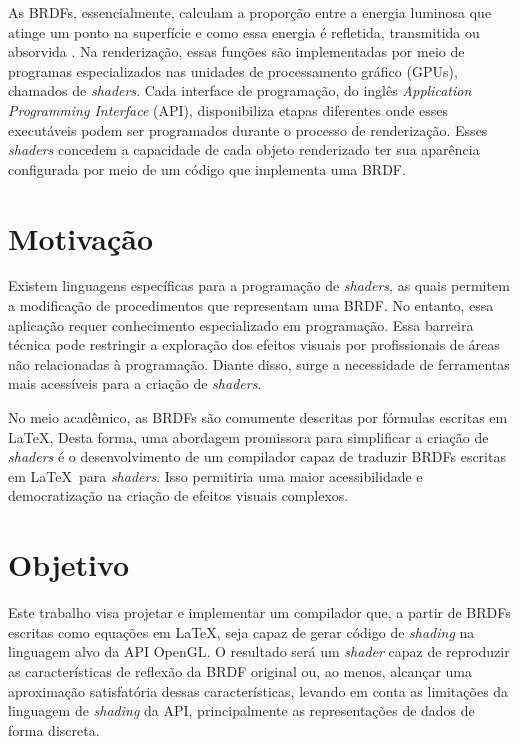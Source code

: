 \documentclass[english, 
               brazil, 
               bsc] %
               {dcomp-abntex2}
\begin{document}
As BRDFs, essencialmente, calculam a proporção entre a energia luminosa que atinge um ponto na superfície e como essa energia é refletida, transmitida ou absorvida \cite{pbr}. Na renderização, essas funções são implementadas por meio de programas especializados nas unidades de processamento gráfico (GPUs), chamados de \textit{shaders}. Cada interface de programação, do inglês \textit{ Application Programming Interface} (API),  disponibiliza etapas diferentes onde esses executáveis podem ser programados durante o processo de renderização. Esses \textit{shaders} concedem a capacidade de cada objeto renderizado ter sua aparência configurada por meio de um código que implementa uma BRDF.




\section{Motivação}




Existem linguagens específicas para a programação de \textit{shaders}, as quais permitem a modificação de procedimentos que representam uma BRDF. No entanto, essa aplicação requer conhecimento especializado em programação. Essa barreira técnica pode restringir a exploração dos efeitos visuais por profissionais de áreas não relacionadas à programação. Diante disso, surge a necessidade de ferramentas mais acessíveis para a criação de \textit{shaders}.


No meio acadêmico, as BRDFs são comumente descritas por fórmulas escritas em \LaTeX, Desta forma, uma abordagem promissora para simplificar a criação de \textit{shaders} é o desenvolvimento de um compilador capaz de traduzir BRDFs   escritas em \LaTeX\  para \textit{shaders}. Isso permitiria uma maior acessibilidade e democratização na criação de efeitos visuais complexos.


\section{Objetivo}
Este trabalho visa projetar e implementar um compilador que, a partir de BRDFs escritas como equações em \LaTeX, seja capaz de gerar código de \textit{shading} na linguagem alvo da API OpenGL. O resultado será um \textit{shader} capaz de reproduzir as características de reflexão da BRDF original ou, ao menos, alcançar uma aproximação satisfatória dessas características, levando em conta as limitações da linguagem de \textit{shading} da API, principalmente as representações de dados de forma discreta. 
\end{document}
